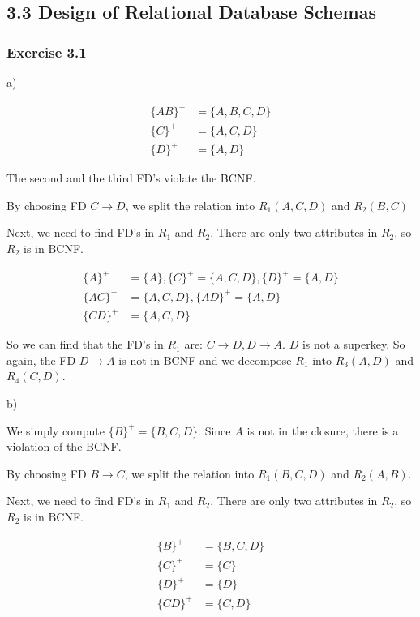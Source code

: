 \documentclass[../../main.tex]{subfiles}
\begin{document}
\subsection{3.3 Design of Relational Database Schemas}

\subsubsection*{Exercise 3.1}

a)

\begin{align*}
  \{AB\}^{+} &= \{A,B,C,D\} \\
  \{C\}^{+} &= \{A,C,D\} \\
  \{D\}^{+} &= \{A,D\}
\end{align*}

The second and the third FD's violate the BCNF.

By choosing FD $C \to D$, we split the relation into
$R_{1}(A,C,D)$ and $R_{2}(B,C)$

Next, we need to find FD's in $R_{1}$ and $R_{2}$. There are
only two attributes in $R_{2}$, so $R_{2}$ is in BCNF.

\begin{align*}
  \{A\}^+ &= \{A\}, \{C\}^+ = \{A, C, D\}, \{D\}^+ = \{A,D\} \\
  \{AC\}^+ &= \{A, C, D\}, \{AD\}^+ = \{A, D\} \\
  \{CD\}^+ &= \{A, C, D\}
\end{align*}

So we can find that the FD's in $R_{1}$ are: $C \to D, D \to A$. $D$
is not a superkey. So again, the FD $D \to A$ is not in BCNF and we decompose
$R_{1}$ into $R_{3}(A,D)$ and $R_{4}(C,D)$.

b)

We simply compute $\{B\}^{+} = \{B,C,D\}$. Since $A$ is not in the
closure, there is a violation of the BCNF.

By choosing FD $B \to C$, we split the relation into
$R_{1}(B,C,D)$ and $R_{2}(A,B)$.

Next, we need to find FD's in $R_{1}$ and $R_{2}$. There are
only two attributes in $R_{2}$, so $R_{2}$ is in BCNF.

\begin{align*}
  \{B\}^{+} &= \{B,C,D\} \\
  \{C\}^{+} &= \{C\} \\
  \{D\}^{+} &= \{D\} \\
  \{CD\}^{+} &= \{C,D\}
\end{align*}
\end{document}
